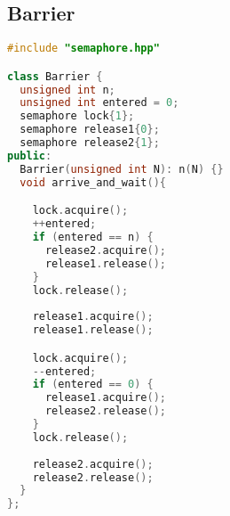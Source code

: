 \subsection{Barrier}
\begin{lstlisting}[language=C++]
#include "semaphore.hpp"

class Barrier {
  unsigned int n;
  unsigned int entered = 0;
  semaphore lock{1};
  semaphore release1{0};
  semaphore release2{1};
public:
  Barrier(unsigned int N): n(N) {}
  void arrive_and_wait(){

    lock.acquire();
    ++entered;
    if (entered == n) {
      release2.acquire();
      release1.release();
    }
    lock.release();
    
    release1.acquire();
    release1.release();

    lock.acquire();
    --entered;
    if (entered == 0) {
      release1.acquire();
      release2.release();
    }
    lock.release();
    
    release2.acquire();
    release2.release();
  }  
};
\end{lstlisting}

